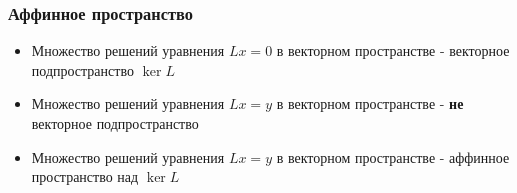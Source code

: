 \documentclass{beamer}
\begin{document}
\begin{frame}[fragile]
\frametitle{Аффинное пространство}
\begin{itemize}
\item Множество решений уравнения \begin{math}Lx=0\end{math} в векторном пространстве - векторное подпространство \begin{math}\ker L\end{math}
\pause
\item Множество решений уравнения \begin{math}Lx=y\end{math} в векторном пространстве - \textbf{не} векторное подпространство
\pause
\item Множество решений уравнения \begin{math}Lx=y\end{math} в векторном пространстве - аффинное пространство над \begin{math}\ker L\end{math}
\end{itemize}
\end{frame}
\end{document}
